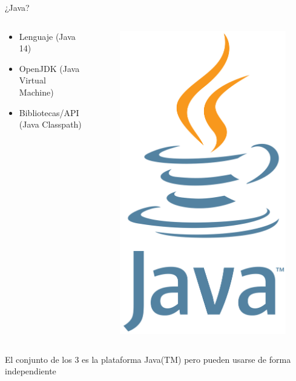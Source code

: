 \documentclass[aspectratio=169]{beamer}
\begin{document}
\begin{frame}[fragile]{¿Java?}
\begin{columns}
    \begin{column}{0.5\textwidth}
        \begin{itemize}
            \item Lenguaje (Java 14)
            \item OpenJDK (Java Virtual Machine)
            \item Bibliotecas/API (Java Classpath)
        \end{itemize}
    \end{column}
    \begin{column}{0.5\textwidth}  %
        \begin{figure}
            \centering
            \includegraphics[width=0.4\linewidth]{Images/java}
        \end{figure}
    \end{column}
\end{columns}
    
    
    
El conjunto de los 3 es la plataforma Java(TM) pero pueden usarse de forma independiente
\end{frame}
\end{document}
